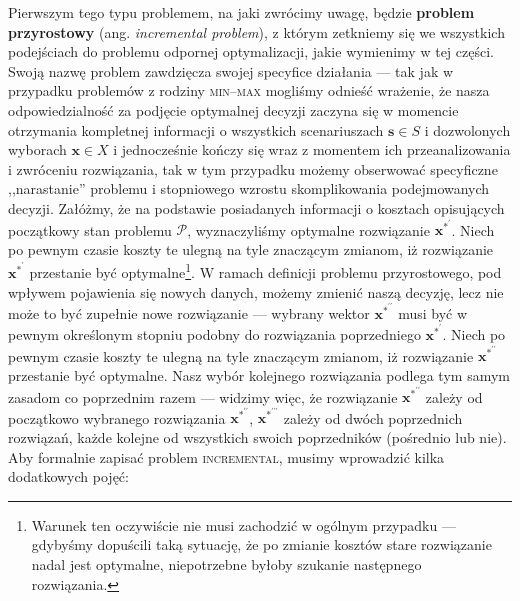 Pierwszym tego typu problemem, na jaki zwrócimy uwagę, będzie \textbf{problem przyrostowy} (ang. \textit{incremental problem}), z którym zetkniemy się we wszystkich podejściach do problemu odpornej optymalizacji, jakie wymienimy w tej części. Swoją nazwę problem zawdzięcza swojej specyfice działania --- tak jak w przypadku problemów z rodziny \textsc{min--max} mogliśmy odnieść wrażenie, że nasza odpowiedzialność za podjęcie optymalnej decyzji zaczyna się w momencie otrzymania kompletnej informacji o wszystkich scenariuszach $\textbf{s} \in S$ i dozwolonych wyborach $\textbf{x} \in X$ i jednocześnie kończy się wraz z momentem ich przeanalizowania i zwróceniu rozwiązania, tak w tym przypadku możemy obserwować specyficzne ,,narastanie'' problemu i stopniowego wzrostu skomplikowania podejmowanych decyzji. Załóżmy, że na podstawie posiadanych informacji o kosztach opisujących początkowy stan problemu $\mathcal{P}$, wyznaczyliśmy optymalne rozwiązanie $\textbf{x}^{\ast^{\prime}}$. Niech po pewnym czasie koszty te ulegną na tyle znaczącym zmianom, iż rozwiązanie $\textbf{x}^{\ast^{\prime}}$ przestanie być optymalne\footnote{Warunek ten oczywiście nie musi zachodzić w ogólnym przypadku --- gdybyśmy dopuścili taką sytuację, że po zmianie kosztów stare rozwiązanie nadal jest optymalne, niepotrzebne byłoby szukanie następnego rozwiązania.}. W ramach definicji problemu przyrostowego, pod wpływem pojawienia się nowych danych, możemy zmienić naszą decyzję, lecz nie może to być zupełnie nowe rozwiązanie --- wybrany wektor $\textbf{x}^{\ast^{\prime\prime}}$ musi być w pewnym określonym stopniu podobny do rozwiązania poprzedniego $\textbf{x}^{\ast^{\prime}}$.  Niech po pewnym czasie koszty te ulegną na tyle znaczącym zmianom, iż rozwiązanie $\textbf{x}^{\ast^{\prime\prime}}$ przestanie być optymalne. Nasz wybór kolejnego rozwiązania podlega tym samym zasadom co poprzednim razem --- widzimy więc, że rozwiązanie $\textbf{x}^{\ast^{\prime\prime}}$ zależy od początkowo wybranego rozwiązania $\textbf{x}^{\ast^{\prime\prime}}$, $\textbf{x}^{\ast^{\prime\prime\prime}}$ zależy od dwóch poprzednich rozwiązań, każde kolejne od wszystkich swoich poprzedników (pośrednio lub nie). Aby formalnie zapisać problem \textsc{incremental}, musimy wprowadzić kilka dodatkowych pojęć:

